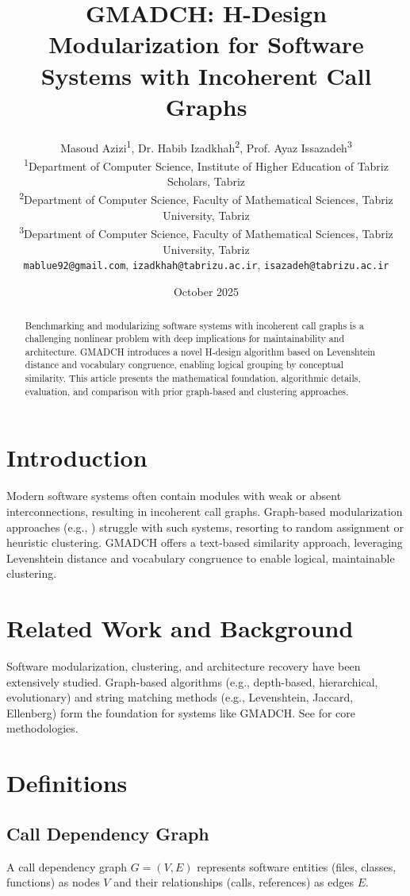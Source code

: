 \documentclass[a4paper,12pt]{article}
\title{GMADCH: H-Design Modularization for Software Systems with Incoherent Call Graphs}
\author{
  Masoud Azizi\textsuperscript{1},
  Dr. Habib Izadkhah\textsuperscript{2},
  Prof. Ayaz Issazadeh\textsuperscript{3}\\
  \small{
  \textsuperscript{1}Department of Computer Science, Institute of Higher Education of Tabriz Scholars, Tabriz\\
  \textsuperscript{2}Department of Computer Science, Faculty of Mathematical Sciences, Tabriz University, Tabriz\\
  \textsuperscript{3}Department of Computer Science, Faculty of Mathematical Sciences, Tabriz University, Tabriz\\
  \texttt{mablue92@gmail.com}, \texttt{izadkhah@tabrizu.ac.ir}, \texttt{isazadeh@tabrizu.ac.ir}
  }
}
\date{October 2025}
\begin{document}
\maketitle

\begin{abstract}
Benchmarking and modularizing software systems with incoherent call graphs is a challenging nonlinear problem with deep implications for maintainability and architecture. GMADCH introduces a novel H-design algorithm based on Levenshtein distance and vocabulary congruence, enabling logical grouping by conceptual similarity. This article presents the mathematical foundation, algorithmic details, evaluation, and comparison with prior graph-based and clustering approaches.
\end{abstract}

\section{Introduction}
Modern software systems often contain modules with weak or absent interconnections, resulting in incoherent call graphs. Graph-based modularization approaches (e.g., \cite{Izadkhah2016,Pourasghar2020}) struggle with such systems, resorting to random assignment or heuristic clustering. GMADCH offers a text-based similarity approach, leveraging Levenshtein distance and vocabulary congruence to enable logical, maintainable clustering.

\section{Related Work and Background}
Software modularization, clustering, and architecture recovery have been extensively studied. Graph-based algorithms (e.g., depth-based, hierarchical, evolutionary) and string matching methods (e.g., Levenshtein, Jaccard, Ellenberg) form the foundation for systems like GMADCH. See \cite{Izadkhah2016,SokalMichener1958,Gusfield1997,Navarro2001,Andritsos2005,Pourasghar2020} for core methodologies.

\section{Definitions}
\subsection{Call Dependency Graph}
A call dependency graph $G = (V, E)$ represents software entities (files, classes, functions) as nodes $V$ and their relationships (calls, references) as edges $E$.
\end{document}
